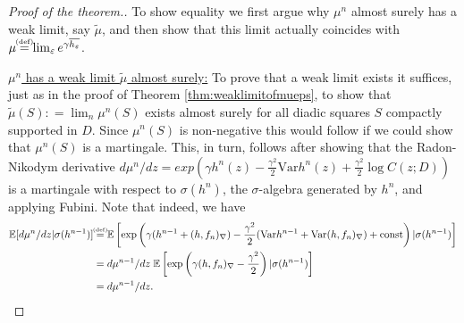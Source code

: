\documentclass[11pt,reqno]{amsart}
\numberwithin{equation}{section}
\newcommand{\eqbydef}{\mathrel{\stackrel{\hspace*{-3mm}\text{\tiny(def)}\hspace*{-3mm}}{=}}}
\newcommand{\deq}{\mathrel{\mathop:}=}
\newcommand{\eps}{\varepsilon}
\begin{document}
\begin{proof}[Proof of the theorem.]
	To show equality we first argue why $\mu^n$ almost surely has a weak limit, say $\tilde\mu$, and then show that this limit actually coincides with $\mu\eqbydef\lim_\eps e^{\gamma\overline{h_\eps}}$.
	
	\underline{$\mu^n$ has a weak limit $\tilde\mu$ almost surely:} To prove that a weak limit exists it suffices, just as in the proof of Theorem \ref{thm:weaklimitofmueps}, to show that $\tilde\mu(S)\deq\lim_n\mu^n(S)$ exists almost surely for all diadic squares $S$ compactly supported in $D$. Since $\mu^n(S)$ is non-negative this would follow if we could show that $\mu^n(S)$ is a martingale. This, in turn, follows after showing that the Radon-Nikodym derivative $d\mu^n/dz = exp\left(\gamma h^n(z)-\frac{\gamma^2}{2}\text{Var}h^n(z)+\frac{\gamma^2}{2}\log C(z;D)\right)$ is a martingale with respect to $\sigma(h^n)$, the $\sigma$-algebra generated by $h^n$, and applying Fubini.
	Note that indeed, we have \begin{align*}
		\mathbb E[d\mu^n/dz|\sigma(h^{n-1})]
		&\eqbydef \mathbb E\left[\exp\left(\gamma (h^{n-1}+(h,f_n)_\nabla) - \frac{\gamma^2}{2}(\text{Var}h^{n-1}+\text{Var}(h,f_n)_\nabla) + \text{const}\right)|\sigma(h^{n-1})\right]\\
		&=d\mu^{n-1}/dz\;\mathbb E\left[\exp\left(\gamma(h,f_n)_\nabla - \frac{\gamma^2}{2}\right)|\sigma(h^{n-1})\right]\\
		&=d\mu^{n-1}/dz.
	\end{align*}
	

\end{proof}
\end{document}
